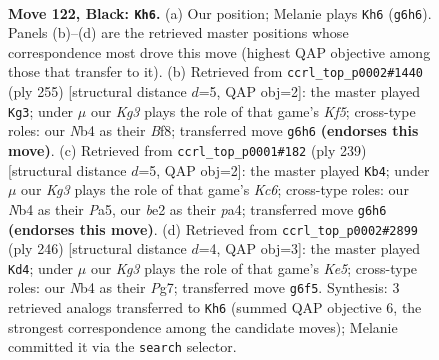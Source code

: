 \documentclass[11pt]{article}
\begin{document}
\clearpage

\begin{figure}[p]\centering
\begin{subfigure}{0.46\textwidth}\centering
\resizebox{\linewidth}{!}{%
\newchessgame
\chessboard[
  setfen={8/8/6k1/6p1/1n6/7K/4B3/8 b - - 2 122},
  showmover=false,
  pgfstyle=straightmove, color=movearrow, markmove={g6-h6}
]}
\caption{}
\end{subfigure}\hfill
\begin{subfigure}{0.46\textwidth}\centering
\resizebox{\linewidth}{!}{%
\newchessgame
\chessboard[
  setfen={5b2/8/8/3B4/3p1kp1/8/4K3/8 b - - 49 128},
  showmover=false,
  pgfstyle=straightmove, color=movearrow, markmove={f4-g3}
]}
\caption{}
\end{subfigure}
\\[4pt]
\begin{subfigure}{0.46\textwidth}\centering
\resizebox{\linewidth}{!}{%
\newchessgame
\chessboard[
  setfen={8/8/7K/p7/P7/2k5/Bp6/8 b - - 1 120},
  showmover=false,
  pgfstyle=straightmove, color=movearrow, markmove={c3-b4}
]}
\caption{}
\end{subfigure}\hfill
\begin{subfigure}{0.46\textwidth}\centering
\resizebox{\linewidth}{!}{%
\newchessgame
\chessboard[
  setfen={2k5/6P1/3P4/4K3/2b4B/8/8/8 w - - 31 124},
  showmover=false,
  pgfstyle=straightmove, color=movearrow, markmove={e5-d4}
]}
\caption{}
\end{subfigure}
\caption{\textbf{Move 122, Black: \texttt{Kh6}.} (a) Our position; Melanie plays \texttt{Kh6} (\texttt{g6h6}). Panels (b)--(d) are the retrieved master positions whose correspondence most drove this move (highest QAP objective among those that transfer to it). (b) Retrieved from \texttt{ccrl\_top\_p0002\#1440} (ply 255) [structural distance $d$=5, QAP obj=2]: the master played \texttt{Kg3}; under $\mu$ our \emph{Kg3} plays the role of that game's \emph{Kf5}; cross-type roles: our \emph{N}b4 as their \emph{B}f8; transferred move \texttt{g6h6} \textbf{(endorses this move)}. (c) Retrieved from \texttt{ccrl\_top\_p0001\#182} (ply 239) [structural distance $d$=5, QAP obj=2]: the master played \texttt{Kb4}; under $\mu$ our \emph{Kg3} plays the role of that game's \emph{Kc6}; cross-type roles: our \emph{N}b4 as their \emph{P}a5, our \emph{b}e2 as their \emph{p}a4; transferred move \texttt{g6h6} \textbf{(endorses this move)}. (d) Retrieved from \texttt{ccrl\_top\_p0002\#2899} (ply 246) [structural distance $d$=4, QAP obj=3]: the master played \texttt{Kd4}; under $\mu$ our \emph{Kg3} plays the role of that game's \emph{Ke5}; cross-type roles: our \emph{N}b4 as their \emph{P}g7; transferred move \texttt{g6f5}. Synthesis: 3 retrieved analogs transferred to \texttt{Kh6} (summed QAP objective 6, the strongest correspondence among the candidate moves); Melanie committed it via the \texttt{search} selector.}
\label{fig:thought-m243}
\end{figure}
\end{document}

